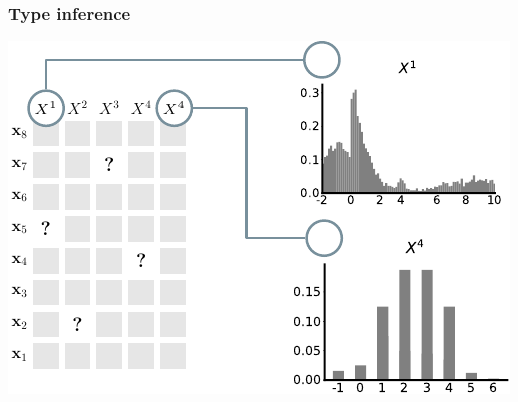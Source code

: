 \documentclass[xcolor={usenames,dvipsnames,svgnames}, compress, aspectratio=169, 11pt]{beamer}
\begin{document}
\begin{frame}[t, htt=bgrey2]
  \frametitle{Type inference}

  \large
  \begin{minipage}[t]{0.6\linewidth}
    \includegraphics[width=.99\linewidth]{figures/abda-miss-hist-type}
  \end{minipage}\hfill\begin{minipage}[t]{0.3\linewidth}
    \vspace{-150pt}
    
    
  \end{minipage}  
\end{frame}
\end{document}
